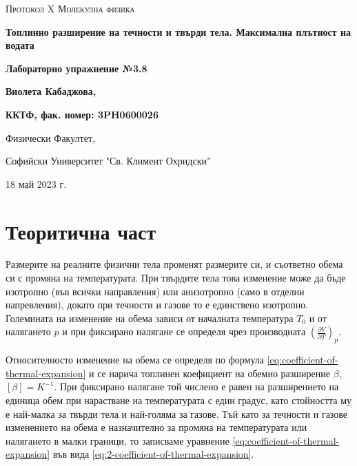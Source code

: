 \documentclass[12pt]{article}
\begin{document}
\begin{titlepage}
	\flushleft
	{\scshape\Large Протокол X \hspace{2cm} Молекулна физика\par}
	\vspace{4cm}
	{\huge\bfseries Топлинно разширение на течности и твърди тела. Максимална плътност на водата\par}
	\vspace{1cm}
	{\LARGE\bfseries Лабораторно упражнение №3.8\par}
	\vspace{5cm}
    {\LARGE\bfseries Виолета Кабаджова, \par}
    {\large\bfseries ККТФ, фак. номер: 3PH0600026\par}
	\vspace{1cm}
	
	{\large Физически Факултет, 
	
	Софийски Университет "Св. Климент Охридски"
	
	18 май 2023 г.\par}
	
\end{titlepage}

\section{Теоритична част}\label{sec:theoretical-part}
Размерите на реалните физични тела променят размерите си, и съответно обема си с промяна на температурата. При твърдите тела това изменение може да бъде изотропно (във всички направления) или анизотропно (само в отделни напревления), докато при течности и газове то е единствено изотропно.
Големината на изменение на обема зависи от началната температура $T_0$ и от налягането $p$ и при фиксирано налягане се определя чрез производната $\left(\frac{\partial V}{\partial T}\right)_p$.

Относителносто изменение на обема се определя по формула \ref{eq:coefficient-of-thermal-expansion} и се нарича топлинен коефициент на обемно разширение $\beta$, $[\beta ]=K^{-1}$. При фиксирано налягане той числено е равен на разширението на единица обем при нарастване на температурата с един градус, като стойността му е най-малка за твърди тела и най-голяма за газове. Тъй като за течности и газове изменението на обема е назначително за промяна на температурата или налягането в малки граници, то записваме уравнение \ref{eq:coefficient-of-thermal-expansion} във вида \ref{eq:2-coefficient-of-thermal-expansion}.
\end{document}
